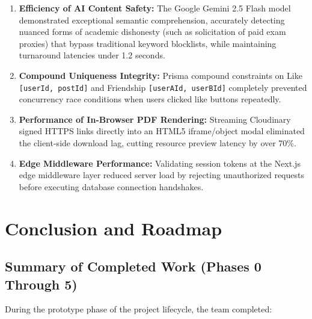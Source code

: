 \documentclass[11pt,a4paper]{report}
\begin{document}
\begin{enumerate}
    \item \textbf{Efficiency of AI Content Safety:} The Google Gemini 2.5 Flash model demonstrated exceptional semantic comprehension, accurately detecting nuanced forms of academic dishonesty (such as solicitation of paid exam proxies) that bypass traditional keyword blocklists, while maintaining turnaround latencies under 1.2 seconds.
    \item \textbf{Compound Uniqueness Integrity:} Prisma compound constraints on Like \texttt{[userId, postId]} and Friendship \texttt{[userAId, userBId]} completely prevented concurrency race conditions when users clicked like buttons repeatedly.
    \item \textbf{Performance of In-Browser PDF Rendering:} Streaming Cloudinary signed HTTPS links directly into an HTML5 iframe/object modal eliminated the client-side download lag, cutting resource preview latency by over 70\%.
    \item \textbf{Edge Middleware Performance:} Validating session tokens at the Next.js edge middleware layer reduced server load by rejecting unauthorized requests before executing database connection handshakes.
\end{enumerate}

\chapter{Conclusion and Roadmap}

\section{Summary of Completed Work (Phases 0 Through 5)}

During the prototype phase of the project lifecycle, the team completed:
\end{document}
